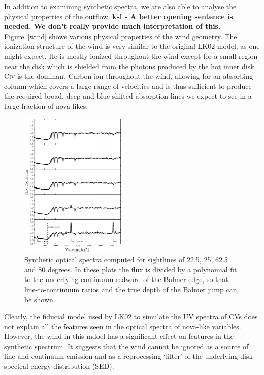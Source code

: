 \documentclass[preprint, a4paper, 11pt]{aastex}
\begin{document}
{In addition to examining synthetic spectra, we are also able to 
analyse the physical properties of the outflow. {\bf ksl - A better opening sentence is needed.  We don't really provide much interpretation of this.}
Figure~\ref{wind} shows various physical properties
of the wind geometry. The ionization structure of the wind
is very similar to the original LK02 model, as one might expect.
He is mostly ionized throughout the wind except for a small region near
the disk which is shielded from the photons produced by the hot inner disk.
C\textsc{iv} is the dominant Carbon ion throughout the wind, allowing
for an absorbing column which covers a large range of velocities and is thus
sufficient to produce the required broad, deep and blue-shifted absorption lines
we expect to see in a large fraction of nova-likes.

\begin{figure} 
\includegraphics[width=0.45\textwidth]{figures/fig6_opt_cont.eps}
\caption{Synthetic optical spectra computed for 
sightlines of 22.5, 25, 62.5 and 80 degrees. In these plots
the flux is divided by a polynomial fit to the 
underlying continuum redward of the Balmer edge, so that 
line-to-continuum ratios and the true depth of the
Balmer jump can be shown.}
\label{spec_continuum}
\end{figure} 


Clearly, the fiducial model used by LK02 to simulate the UV spectra of CVs does not  explain all
the features seen in the optical spectra of nova-like variables. However,
the wind in this mdoel has a significant effect on features in the synthetic spectrum. 
It suggests that the wind  cannot be ignored as a source of line and continuum emission and as a reprocessing `filter'
of the underlying disk spectral energy distribution (SED).



}
\end{document}
